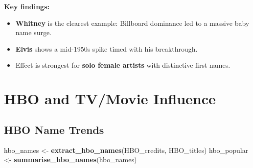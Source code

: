 \documentclass[
]{article}
\newenvironment{Shaded}{\begin{snugshade}}{\end{snugshade}}
\newcommand{\FunctionTok}[1]{\textcolor[rgb]{0.13,0.29,0.53}{\textbf{#1}}}
\newcommand{\NormalTok}[1]{#1}
\newcommand{\OtherTok}[1]{\textcolor[rgb]{0.56,0.35,0.01}{#1}}
\providecommand{\tightlist}{%
  \setlength{\itemsep}{0pt}\setlength{\parskip}{0pt}}
\begin{document}
\textbf{Key findings:}

\begin{itemize}
\tightlist
\item
  \textbf{Whitney} is the clearest example: Billboard dominance led to a
  massive baby name surge.
\item
  \textbf{Elvis} shows a mid-1950s spike timed with his breakthrough.
\item
  Effect is strongest for \textbf{solo female artists} with distinctive
  first names.
\end{itemize}

\newpage

\section{HBO and TV/Movie Influence}\label{hbo-and-tvmovie-influence}

\subsection{HBO Name Trends}\label{hbo-name-trends}

\begin{Shaded}
\begin{Highlighting}[]
\NormalTok{hbo\_names   }\OtherTok{\textless{}{-}} \FunctionTok{extract\_hbo\_names}\NormalTok{(HBO\_credits, HBO\_titles)}
\NormalTok{hbo\_popular }\OtherTok{\textless{}{-}} \FunctionTok{summarise\_hbo\_names}\NormalTok{(hbo\_names)}
\end{Highlighting}
\end{Shaded}
\end{document}
